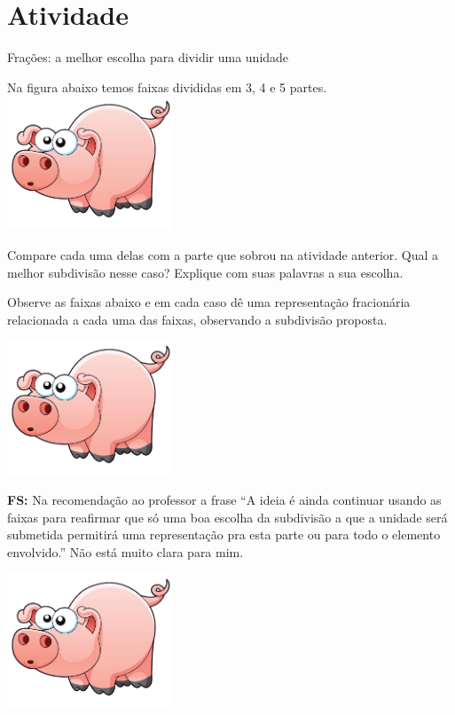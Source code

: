 \documentclass[a4,12pt]{book}
\newcounter{atividade}
\begin{document}
\section{Atividade}



Frações: a melhor escolha para dividir uma unidade



Na figura abaixo temos faixas divididas em 3, 4 e 5 partes.
\includegraphics[width=\textwidth,height=4cm, keepaspectratio]{pig}

Compare cada uma delas com a parte que sobrou na atividade anterior.
Qual a melhor subdivisão nesse caso?
Explique com suas palavras a sua escolha.

Observe as faixas abaixo e em cada caso dê uma representação fracionária relacionada a cada uma das faixas, observando a subdivisão proposta.

\includegraphics[width=\textwidth,height=4cm, keepaspectratio]{pig}




{\bf FS:} Na recomendação ao professor a frase ``A ideia é ainda continuar usando as faixas para reafirmar que só uma boa escolha da subdivisão a que a unidade será submetida permitirá uma representação pra esta parte ou para todo o elemento envolvido.'' Não está muito clara para mim.



\includegraphics[width=\textwidth,height=4cm, keepaspectratio]{pig}
\end{document}
